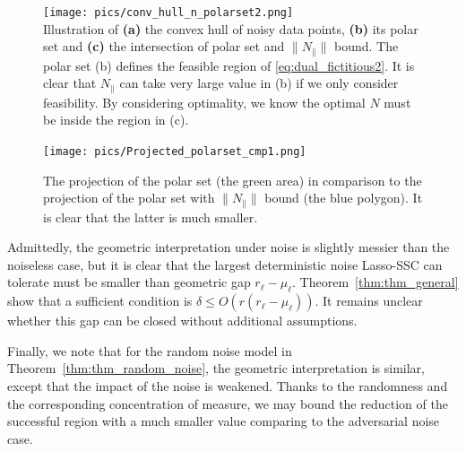 \documentclass{ctexart}
\begin{document}
\begin{figure}
  \centering
    \texttt{[image: pics/conv\_hull\_n\_polarset2.png]}\\
  \caption{Illustration of \textbf{(a)} the convex hull of noisy data points, \textbf{(b)} its polar set and \textbf{(c)} the intersection of polar set and $\|N_{\parallel}\|$ bound. The polar set (b) defines the feasible region of \eqref{eq:dual_fictitious2}. It is clear that $N_{\parallel}$ can take very large value in (b) if we only consider feasibility. By considering optimality, we know the optimal $N$ must be inside the region in (c).} \label{fig.convex_hull_n_polar}
    \texttt{[image: pics/Projected\_polarset\_cmp1.png]}\\
  \caption{The projection of the polar set (the green area) in comparison to the projection of the polar set with $\|N_{\parallel}\|$ bound (the blue polygon). It is clear that the latter is much smaller.}\label{fig.ProjPolar}
\end{figure}

Admittedly, the geometric interpretation under noise is slightly messier than the noiseless case, but it is clear that the largest deterministic noise Lasso-SSC can tolerate must be smaller than geometric gap $r_\ell-\mu_\ell$. Theorem~\ref{thm:thm_general} show that a sufficient condition is $\delta \leq O(r(r_\ell-\mu_\ell))$. It remains unclear whether this gap can be closed without additional assumptions.


Finally, we note that for the random noise model in Theorem~\ref{thm:thm_random_noise}, the geometric interpretation is similar, except that the impact of the noise is weakened. Thanks to the randomness and the corresponding concentration of measure, we may bound the reduction of the successful region with a much smaller value comparing to the adversarial noise case.

\end{document}
